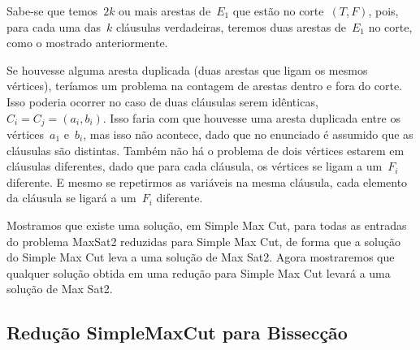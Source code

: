 		Sabe-se que temos~$2k$ ou mais arestas de~$E_1$ que estão no
		corte~$(T,F)$, pois, para cada uma das~$k$ cláusulas
		verdadeiras, teremos duas arestas de~$E_1$ no corte, como
		o mostrado anteriormente.

		Se houvesse alguma aresta duplicada (duas arestas que ligam
		os mesmos vértices), teríamos um problema na contagem de
		arestas dentro e fora do corte.
		Isso poderia ocorrer no caso de duas cláusulas serem 
		idênticas,~${C_i=C_j=(a_i,b_i)}$.
		Isso faria com que houvesse uma aresta duplicada entre
		os vértices~$a_1$ e~$b_i$, mas isso não acontece, dado que
		no enunciado é assumido que as cláusulas são distintas.
		Também não há o problema de dois vértices estarem em cláusulas
		diferentes, dado que para cada cláusula, os vértices se ligam
		a um~$F_i$ diferente.
		E mesmo se repetirmos as variáveis na mesma cláusula, cada
		elemento da cláusula se ligará a um~$F_i$ diferente.

		\bigskip

		Mostramos que existe uma solução, em Simple Max Cut, 
		para todas as entradas do
		problema MaxSat2 reduzidas para Simple Max Cut, de forma que
		a solução do Simple Max Cut leva a uma solução de Max Sat2.
		Agora mostraremos que qualquer solução obtida em 
		uma redução para Simple Max Cut levará a uma solução de Max Sat2.


\subsection{Redução SimpleMaxCut para Bissecção}




	

